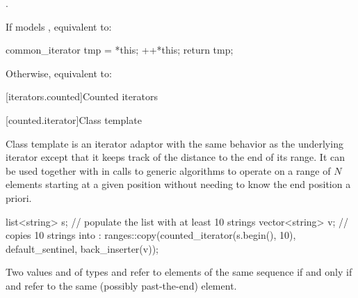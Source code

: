 \documentclass{wg21}
\begin{document}
\begin{itemdescr}
	\pnum

	\expects {}.
	
	\pnum
	\effects
	If  models , equivalent to:
	\begin{codeblock}
		common_iterator tmp = *this;
		++*this;
		return tmp;
	\end{codeblock}
	Otherwise, equivalent to: 
\end{itemdescr}


[iterators.counted]{Counted iterators}

[counted.iterator]{Class template }

\pnum
Class template  is an iterator adaptor
with the same behavior as the underlying iterator except that
it keeps track of the distance to the end of its range.
It can be used together with 
in calls to generic algorithms to operate on
a range of $N$ elements starting at a given position
without needing to know the end position a priori.

\pnum
\begin{example}
	\begin{codeblock}
		list<string> s;
		// populate the list  with at least 10 strings
		vector<string> v;
		// copies 10 strings into :
		ranges::copy(counted_iterator(s.begin(), 10), default_sentinel, back_inserter(v));
	\end{codeblock}
\end{example}

\pnum
Two values  and  of types
and
refer to elements of the same sequence if and only if
and
refer to the same (possibly past-the-end) element.
\end{document}
